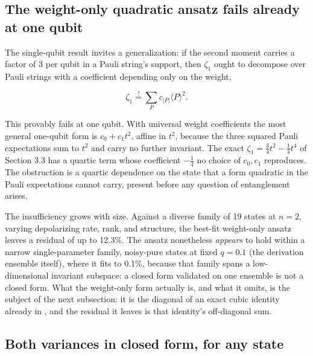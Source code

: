 \documentclass[a4paper,superscriptaddress,nofootinbib,onecolumn,nopdfoutputerror]{quantumarticle}
\begin{document}
\hypertarget{the-weight-only-quadratic-ansatz-fails}{%
\subsection{\texorpdfstring{The weight-only quadratic ansatz fails
already at one
qubit}{The weight-only quadratic ansatz fails already at one qubit}}\label{the-weight-only-quadratic-ansatz-fails}}

The single-qubit result invites a generalization: if the second moment
carries a factor of \(3\) per qubit in a Pauli string's support, then
\(\zeta_1\) ought to decompose over Pauli strings with a coefficient
depending only on the weight,

\[\zeta_1 \stackrel{?}{=} \sum_P c_{|P|} \langle P \rangle^2 .\]

This provably fails at one qubit. With universal weight coefficients the
most general one-qubit form is \(c_0 + c_1 t^2\), affine in \(t^2\),
because the three squared Pauli expectations sum to \(t^2\) and carry no
further invariant. The exact \(\zeta_1 = \tfrac{3}{4} t^2 - \tfrac{1}{4} t^4\)
of Section 3.3 has a quartic term whose coefficient \(-\tfrac{1}{4}\) no
choice of \(c_0, c_1\) reproduces. The obstruction is a quartic dependence
on the state that a form quadratic in the Pauli expectations cannot carry,
present before any question of entanglement arises.

The insufficiency grows with size. Against a diverse family of 19 states
at \(n = 2\), varying depolarizing rate, rank, and structure, the best-fit
weight-only ansatz leaves a residual of up to 12.3\%. The ansatz
nonetheless \emph{appears} to hold within a narrow single-parameter
family, noisy-pure states at fixed \(q = 0.1\) (the derivation ensemble itself),
where it fits to 0.1\%,
because that family spans a low-dimensional invariant subspace: a
closed form validated on one ensemble is not a closed form. What the
weight-only form actually is, and what it omits, is the subject of the
next subsection: it is the diagonal of an exact cubic identity already in
\cite{huang2020shadows}, and the residual it leaves is that identity's
off-diagonal sum.

\subsection{\texorpdfstring{Both variances in closed form, for any state}{Both variances in closed form, for any state}}
\label{sec:zeta-closed-form}
\end{document}
